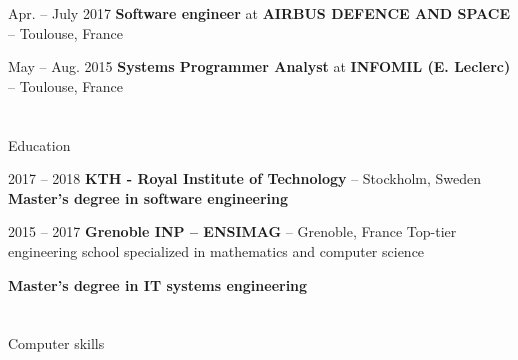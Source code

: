 \documentclass[a4paper, 10pt]{article}
\begin{document}
\begin{datedEntry}
    {Apr. -- July 2017}
    {\textbf{Software engineer} at \textbf{AIRBUS DEFENCE AND SPACE} -- Toulouse, France}

\end{datedEntry}

\begin{datedEntry}
    {May -- Aug. 2015}
    {\textbf{Systems Programmer Analyst} at \textbf{INFOMIL (E. Leclerc)} -- Toulouse, France}
\end{datedEntry}


\section{\faGraduationCap}{Education}

\begin{datedEntry}
    {2017 -- 2018}
    {\textbf{KTH - Royal Institute of Technology} -- Stockholm, Sweden}
    \textbf{Master's degree in software engineering}

    \smallskip
\end{datedEntry}

\begin{datedEntry}
    {2015 -- 2017}
    {\textbf{Grenoble INP -- ENSIMAG} -- Grenoble, France}
    Top-tier engineering school specialized in mathematics and computer science

    \smallskip
    \textbf{Master's degree in IT systems engineering}

    \smallskip
\end{datedEntry}


\section{\faLaptop}{Computer skills}
\end{document}
